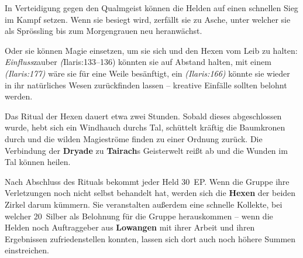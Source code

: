 In Verteidigung gegen den Qualmgeist können die Helden auf einen schnellen Sieg im Kampf setzen.
Wenn sie besiegt wird, zerfällt sie zu Asche, unter welcher sie als Sprössling bis zum Morgengrauen neu heranwächst.

Oder sie können Magie einsetzen, um sie sich und den Hexen vom Leib zu halten:
\textit{Einfluss}zauber \emph(Ilaris:133--136) könnten sie auf Abstand halten, mit einem  \emph{(Ilaris:177)} wäre sie für eine Weile besänftigt, ein  \emph{(Ilaris:166)} könnte sie wieder in ihr natürliches Wesen zurückfinden lassen -- kreative Einfälle sollten belohnt werden.

Das Ritual der Hexen dauert etwa zwei Stunden. Sobald dieses abgeschlossen wurde, hebt sich ein Windhauch durchs Tal, schüttelt kräftig die Baumkronen durch und die wilden Magieströme finden zu einer Ordnung zurück.
Die Verbindung der \textbf{Dryade} zu \textbf{Tairach}s Geisterwelt reißt ab und die Wunden im Tal können heilen.


\neuespalte


Nach Abschluss des Rituals bekommt jeder Held 30~EP.
Wenn die Gruppe ihre Verletzungen noch nicht selbst behandelt hat, werden sich die \textbf{Hexen} der beiden Zirkel darum kümmern.
Sie veranstalten außerdem eine schnelle Kollekte, bei welcher 20~Silber als Belohnung für die Gruppe herauskommen -- wenn die Helden noch Auftraggeber aus \textbf{Lowangen} mit ihrer Arbeit und ihren Ergebnissen zufriedenstellen konnten, lassen sich dort auch noch höhere Summen einstreichen. 

